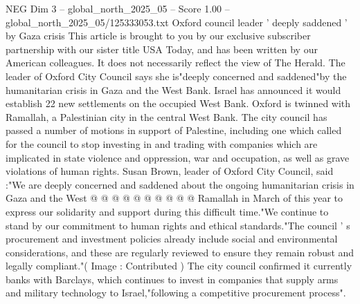 \begin{textsample}{NEG Dim 3 – global\_north\_2025\_05 – Score 1.00 – global\_north\_2025\_05/125333053.txt}  \label{ex:f3_neg_328}
Oxford council leader ' deeply saddened ' by Gaza crisis This article is brought to you by our exclusive subscriber partnership with our sister title USA Today, and has been written by our American colleagues.
It does not necessarily reflect the view of The Herald.
The leader of Oxford City Council says she is"deeply concerned and saddened"by the humanitarian crisis in Gaza and the West Bank.
Israel has announced it would establish 22 new settlements on the occupied West Bank.
Oxford is twinned with Ramallah, a Palestinian city in the central West Bank.
The city council has passed a number of motions in support of Palestine, including one which called for the council to stop investing in and trading with companies which are implicated in state violence and oppression, war and occupation, as well as grave violations of human rights.
Susan Brown, leader of Oxford City Council, said :"We are deeply concerned and saddened about the ongoing humanitarian crisis in Gaza and the West @ @ @ @ @ @ @ @ @ @ Ramallah in March of this year to express our solidarity and support during this difficult time."We continue to stand by our commitment to human rights and ethical standards."The council ' s procurement and investment policies already include social and environmental considerations, and these are regularly reviewed to ensure they remain robust and legally compliant."( Image : Contributed ) The city council confirmed it currently banks with Barclays, which continues to invest in companies that supply arms and military technology to Israel,"following a competitive procurement process".

\end{textsample}
